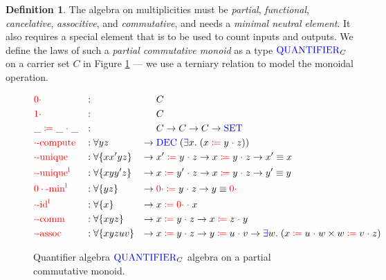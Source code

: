 \documentclass[a4paper,UKenglish,cleveref, autoref, thm-restate,authorcolumns]{lipics-v2019}
\theoremstyle{definition}
\newtheorem{nidefinition}[theorem]{Definition}
\newcommand{\type}[1]{\textcolor{blue}{\operatorname{#1}}}
\newcommand{\field}[1]{\textcolor{red}{\operatorname{#1}}}
\newcommand{\op}[3]{#1 \; \field{\coloneqq} \; #2 \; \field{\cdot} \; #3}
\newcommand{\zero}{\field{0\cdot}}
\newcommand{\one}{\field{1\cdot}}
\newcommand{\Set}{\type{SET}}
\newcommand{\Quantifier}{\type{QUANTIFIER}}
\begin{document}
\begin{nidefinition}
  The algebra on multiplicities must be \emph{partial}, \emph{functional}, \emph{cancelative}, \emph{associtive}, and \emph{commutative}, and needs a \emph{minimal neutral element}.
  It also requires a special element that is to be used to count inputs and outputs.
  We define the laws of such a \emph{partial commutative monoid} as a type $\Quantifier_C$ on a carrier set $C$ in Figure \ref{fig:multiplicities} --- we use a terniary relation to model the monoidal operation.
  
  \begin{figure}[h]
  \begin{equation}
  \begin{aligned}
    &\zero                  &:{} &                      &        & C \\
    &\one                   &:{} &                      &        & C \\
    &\op{\_}{\_}{\_}        &:{} &                      &        & C \to C \to C \to \Set \\
    &\field{\cdot-compute}  &:{} &\forall y z           & \to \; & \type{DEC} \; (\type{\exists} x . \; (\op{x}{y}{z})) \\
    &\field{\cdot-unique}   &:{} &\forall \{x x' y z\}  & \to \; & \op{x'}{y}{z} \to \op{x}{y}{z} \to x' \equiv x \\
    &\field{\cdot-unique^l} &:{} &\forall \{x y y' z\}  & \to \; & \op{x}{y'}{z} \to \op{x}{y}{z} \to y' \equiv y \\
    &\field{0\cdot-min^l}   &:{} &\forall \{y z\}       & \to \; & \op{\zero}{y}{z} \to y \equiv \zero \\
    &\field{\cdot-id^l}     &:{} &\forall \{x\}         & \to \; & \op{x}{\zero}{x} \\
    &\field{\cdot-comm}     &:{} &\forall \{x y z\}     & \to \; & \op{x}{y}{z} \to \op{x}{z}{y} \\
    &\field{\cdot-assoc}    &:{} &\forall \{x y z u v\} & \to \; & \op{x}{y}{z} \to \op{y}{u}{v} \to \type{\exists} w . \; (\op{x}{u}{w} \times \op{w}{v}{z})
  \end{aligned}
  \end{equation}
  \caption{Quantifier algebra $\Quantifier_C$ algebra on a partial commutative monoid.}
  \label{fig:multiplicities}
  \end{figure}
\end{nidefinition}
\end{document}
